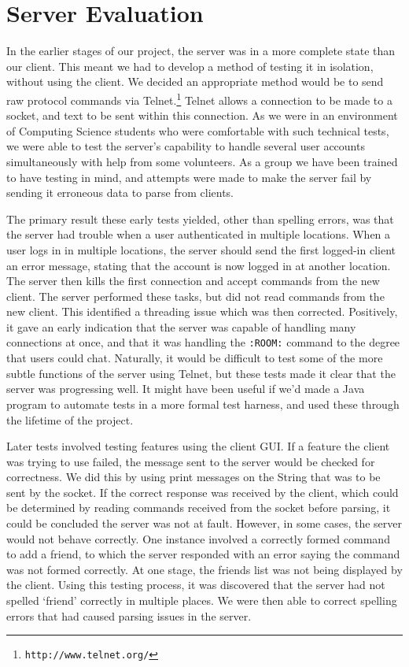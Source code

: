 \section{Server Evaluation}
\label{server_eval}

In the earlier stages of our project, the server was in a more complete state than our client. This meant we had to develop a method of testing it in isolation, without using the client. We decided an appropriate method would be to send raw protocol commands via Telnet.\footnote{\texttt{http://www.telnet.org/}} Telnet allows a connection to be made to a socket, and text to be sent within this connection. As we were in an environment of Computing Science students who were comfortable with such technical tests, we were able to test the server's capability to handle several user accounts simultaneously with help from some volunteers. As a group we have been trained to have testing in mind, and attempts were made to make the server fail by sending it erroneous data to parse from clients.

The primary result these early tests yielded, other than spelling errors, was that the server had trouble when a user authenticated in multiple locations. When a user logs in in multiple locations, the server should send the first logged-in client an error message, stating that the account is now logged in at another location. The server then kills the first connection and accept commands from the new client. The server performed these tasks, but did not read commands from the new client. This identified a threading issue which was then corrected. Positively, it gave an early indication that the server was capable of handling many connections at once, and that it was handling the \texttt{:ROOM:} command to the degree that users could chat. Naturally, it would be difficult to test some of the more subtle functions of the server using Telnet, but these tests made it clear that the server was progressing well. It might have been useful if we'd made a Java program to automate tests in a more formal test harness, and used these through the lifetime of the project. 	

Later tests involved testing features using the client GUI. If a feature the client was trying to use failed, the message sent to the server would be checked for correctness. We did this by using print messages on the String that was to be sent by the socket. If the correct response was received by the client, which could be determined by reading commands received from the socket before parsing, it could be concluded the server was not at fault. However, in some cases, the server would not behave correctly. One instance involved a correctly formed command to add a friend, to which the server responded with an error saying the command was not formed correctly. At one stage, the friends list was not being displayed by the client. Using this testing process, it was discovered that the server had not spelled `friend' correctly in multiple places. We were then able to correct spelling errors that had caused parsing issues in the server. 

